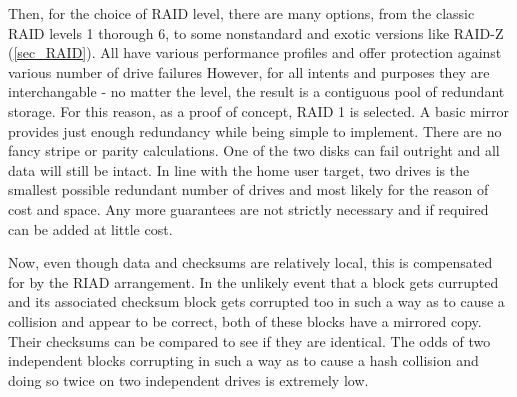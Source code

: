         Then, for the choice of RAID level, there are many options, from the
        classic RAID levels 1 thorough 6, to some nonstandard and exotic
        versions like RAID-Z (\ref{sec_RAID}). All have various performance
        profiles and offer protection against various number of drive failures
        However, for all intents and purposes they are interchangable - no
        matter the level, the result is a contiguous pool of redundant storage.
        For this reason, as a proof of concept, RAID 1 is selected. A basic
        mirror provides just enough redundancy while being simple to implement.
        There are no fancy stripe or parity calculations. One of the two disks
        can fail outright and all data will still be intact.  In line with the
        home user target, two drives is the smallest possible redundant number
        of drives and most likely for the reason of cost and space. Any more
        guarantees are not strictly necessary and if required can be added at
        little cost.

        Now, even though data and checksums are relatively local, this is
        compensated for by the RIAD arrangement. In the unlikely event that a
        block gets currupted and its associated checksum block gets corrupted
        too in such a way as to cause a collision and appear to be correct,
        both of these blocks have a mirrored copy. Their checksums can be
        compared to see if they are identical. The odds of two independent
        blocks corrupting in such a way as to cause a hash collision and doing
        so twice on two independent drives is extremely low.
